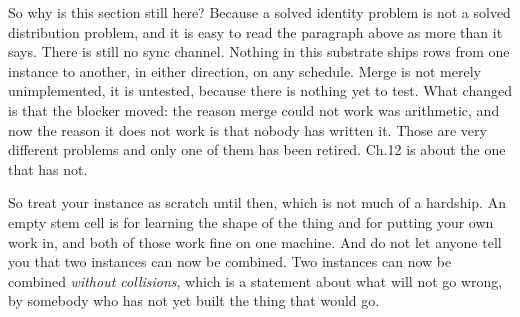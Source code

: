 So why is this section still here? Because a solved identity problem is not a solved distribution problem, and it is easy to read the paragraph above as more than it says. There is still no sync channel. Nothing in this substrate ships rows from one instance to another, in either direction, on any schedule. Merge is not merely unimplemented, it is untested, because there is nothing yet to test. What changed is that the blocker moved: the reason merge could not work was arithmetic, and now the reason it does not work is that nobody has written it. Those are very different problems and only one of them has been retired. Ch.12 is about the one that has not.

So treat your instance as scratch until then, which is not much of a hardship. An empty stem cell is for learning the shape of the thing and for putting your own work in, and both of those work fine on one machine. And do not let anyone tell you that two instances can now be combined. Two instances can now be combined \emph{without collisions}, which is a statement about what will not go wrong, by somebody who has not yet built the thing that would go.
